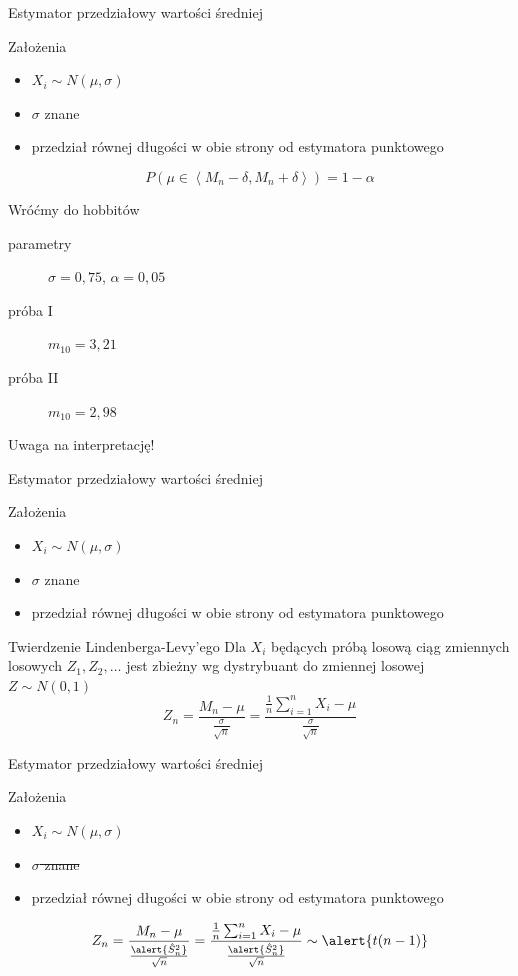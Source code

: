 \documentclass{mp}
\begin{document}
\begin{frame}{Estymator przedziałowy wartości średniej}
\begin{block}{Założenia}
\begin{itemize}
\item $X_i\sim N(\mu,\sigma)$
\pause
\item $\sigma$ znane
\pause
\item przedział równej długości w obie strony od estymatora punktowego
\end{itemize}
\end{block}
\pause
\[ P(\mu\in \left<M_n-\delta, M_n+\delta\right>)=1-\alpha \]
\end{frame}

\begin{frame}{Wróćmy do hobbitów}
\begin{description}
\item[parametry] $\sigma=0{,}75$, $\alpha=0{,}05$
\pause
\item[próba I] $m_{10}=3{,}21$
\pause
\item[próba II] $m_{10}=2{,}98$
\end{description}
\pause
\alert{Uwaga na interpretację!}
\end{frame}

\begin{frame}{Estymator przedziałowy wartości średniej}
\begin{block}{Założenia}
\begin{itemize}
\item \st{$X_i\sim N(\mu,\sigma)$}
\item $\sigma$ znane
\item przedział równej długości w obie strony od estymatora punktowego
\end{itemize}
\end{block}
\pause
\begin{block}{Twierdzenie Lindenberga-Levy'ego}
Dla $X_i$ będących próbą losową ciąg zmiennych losowych $Z_1, Z_2, \ldots$ jest zbieżny wg dystrybuant do zmiennej losowej $Z\sim N(0,1)$
\[ Z_n=\frac{M_n -\mu}{\frac{\sigma}{\sqrt{n}}}=\frac{\frac{1}{n}\sum_{i=1}^n X_i -\mu}{\frac{\sigma}{\sqrt{n}}} \]
\end{block}
\end{frame}

\begin{frame}{Estymator przedziałowy wartości średniej}
\begin{block}{Założenia}
\begin{itemize}
\item \st{$X_i\sim N(\mu,\sigma)$}
\item \st{$\sigma$ znane}
\item przedział równej długości w obie strony od estymatora punktowego
\end{itemize}
\end{block}
\pause
\begin{block}{}
\[ Z_n=\frac{M_n -\mu}{\frac{\alert{\hat{S}^2_n}}{\sqrt{n}}}=\frac{\frac{1}{n}\sum_{i=1}^n X_i -\mu}{\frac{\alert{\hat{S}^2_n}}{\sqrt{n}}} \sim \alert{t(n-1)} \]
\end{block}
\end{frame}
\end{document}
